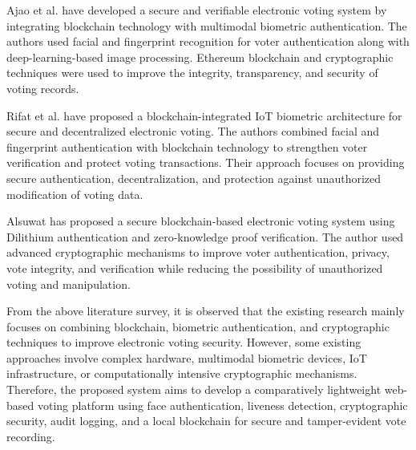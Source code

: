 \documentclass[12pt,a4paper]{report}
\begin{document}
\normalsize
Ajao et al. have developed a secure and verifiable electronic voting
system by integrating blockchain technology with multimodal biometric
authentication. The authors used facial and fingerprint recognition for
voter authentication along with deep-learning-based image processing.
Ethereum blockchain and cryptographic techniques were used to improve
the integrity, transparency, and security of voting records.

Rifat et al. have proposed a blockchain-integrated IoT biometric
architecture for secure and decentralized electronic voting. The authors
combined facial and fingerprint authentication with blockchain technology
to strengthen voter verification and protect voting transactions. Their
approach focuses on providing secure authentication, decentralization,
and protection against unauthorized modification of voting data.

Alsuwat has proposed a secure blockchain-based electronic voting system
using Dilithium authentication and zero-knowledge proof verification.
The author used advanced cryptographic mechanisms to improve voter
authentication, privacy, vote integrity, and verification while reducing
the possibility of unauthorized voting and manipulation.

From the above literature survey, it is observed that the existing
research mainly focuses on combining blockchain, biometric authentication,
and cryptographic techniques to improve electronic voting security.
However, some existing approaches involve complex hardware, multimodal
biometric devices, IoT infrastructure, or computationally intensive
cryptographic mechanisms. Therefore, the proposed system aims to develop
a comparatively lightweight web-based voting platform using face
authentication, liveness detection, cryptographic security, audit logging,
and a local blockchain for secure and tamper-evident vote recording.
\normalsize
\newpage
\scriptsize
\renewcommand{\arraystretch}{1.25}
\end{document}
